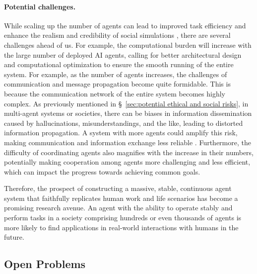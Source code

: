 \paragraph{Potential challenges.}
While scaling up the number of agents can lead to improved task efficiency and enhance the realism and credibility of social simulations \cite{DBLP:journals/corr/abs-2304-03442, DBLP:journals/corr/abs-2307-07924, DBLP:journals/corr/abs-2307-04986}, there are several challenges ahead of us.
For example, the computational burden will increase with the large number of deployed AI agents, calling for better architectural design and computational optimization to ensure the smooth running of the entire system. 
For example, as the number of agents increases, the challenges of communication and message propagation become quite formidable. This is because the communication network of the entire system becomes highly complex. 
As previously mentioned in \S \ \ref{sec:potential ethical and social risks}, in multi-agent systems or societies, there can be biases in information dissemination caused by hallucinations, misunderstandings, and the like, leading to distorted information propagation. A system with more agents could amplify this risk, making communication and information exchange less reliable \cite{DBLP:journals/corr/abs-2308-00352}. Furthermore, the difficulty of coordinating agents also magnifies with the increase in their numbers, potentially making cooperation among agents more challenging and less efficient, which can impact the progress towards achieving common goals.

Therefore, the prospect of constructing a massive, stable, continuous agent system that faithfully replicates human work and life scenarios has become a promising research avenue. An agent with the ability to operate stably and perform tasks in a society comprising hundreds or even thousands of agents is more likely to find applications in real-world interactions with humans in the future.

  
\subsection{Open Problems}\label{sec:Open Problems}


